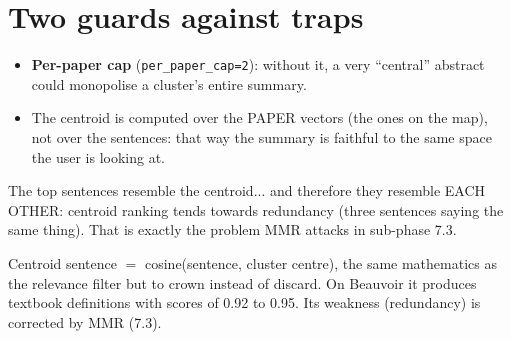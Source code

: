 \documentclass[11pt,a4paper]{article}
\begin{document}
\section{Two guards against traps}

\begin{itemize}
  \item \textbf{Per-paper cap} (\texttt{per\_paper\_cap=2}): without it, a very ``central''
        abstract could monopolise a cluster's entire summary.
  \item The centroid is computed over the PAPER vectors (the ones on the map), not over the
        sentences: that way the summary is faithful to the same space the user is looking at.
\end{itemize}

\begin{ojo}
The top sentences resemble the centroid... and therefore they resemble EACH OTHER: centroid
ranking tends towards redundancy (three sentences saying the same thing). That is exactly the
problem MMR attacks in sub-phase 7.3.
\end{ojo}

\begin{resumen}
Centroid sentence $=$ cosine(sentence, cluster centre), the same mathematics as the relevance
filter but to crown instead of discard. On Beauvoir it produces textbook definitions with
scores of 0.92 to 0.95. Its weakness (redundancy) is corrected by MMR (7.3).
\end{resumen}
\end{document}
